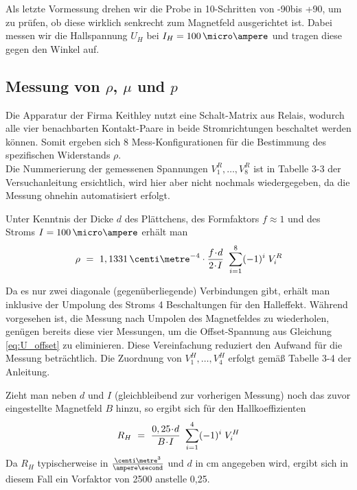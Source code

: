 Als letzte Vormessung drehen wir die Probe in 10\degree-Schritten von -90\degree bis +90\degree, um zu prüfen, ob diese wirklich senkrecht zum Magnetfeld ausgerichtet ist. Dabei messen wir die Hallspannung $U_H$ bei $I_H = 100\,\micro\ampere$ und tragen diese gegen den Winkel auf.

\newpage
\subsection{Messung von $\rho$, $\mu$ und $p$}

Die Apparatur der Firma Keithley nutzt eine Schalt-Matrix aus Relais, wodurch alle vier benachbarten Kontakt-Paare in beide Stromrichtungen beschaltet werden können. Somit ergeben sich 8 Mess-Konfigurationen für die Bestimmung des spezifischen Widerstands $\rho$.\\
Die Nummerierung der gemessenen Spannungen $V^R_1, \dots, V^R_8$ ist in Tabelle 3-3 der Versuchanleitung ersichtlich, wird hier aber nicht nochmals wiedergegeben, da die Messung ohnehin automatisiert erfolgt.

Unter Kenntnis der Dicke $d$ des Plättchens, des Formfaktors $f \approx 1$ und des Stroms  $I = 100\,\micro\ampere$ erhält man
\begin{equation}
\rho ~=~ 1,1331 \,\centi\metre^{-4} \cdot \frac{f \cdt d}{2 \cdt I} ~ \sum\limits_{i=1}^8 (-1)^i \; V^R_i
\end{equation}

Da es nur zwei \glqq diagonale\grqq{} (gegenüberliegende) Verbindungen gibt, erhält man inklusive der Umpolung des Stroms 4 Beschaltungen für den Halleffekt. Während vorgesehen ist, die Messung nach Umpolen des Magnetfeldes zu wiederholen, genügen bereits diese vier Messungen, um die Offset-Spannung aus Gleichung \eqref{eq:U_offset} zu eliminieren. Diese Vereinfachung reduziert den Aufwand für die Messung beträchtlich. Die Zuordnung von $V^H_1, \dots, V^H_4$ erfolgt gemäß Tabelle 3-4 der Anleitung.

Zieht man neben $d$ und $I$ (gleichbleibend zur vorherigen Messung) noch das zuvor eingestellte Magnetfeld $B$ hinzu, so ergibt sich für den Hallkoeffizienten 
\begin{equation}
R_H ~=~ \frac{0,25 \!\cdot\! d}{B \!\cdot\! I} ~ \sum\limits_{i=1}^4 (-1)^i \; V^H_i
\end{equation}
Da $R_H$ typischerweise in $\tfrac{\centi\metre^3}{\ampere\second}$ und $d$ in cm angegeben wird, ergibt sich in diesem Fall ein Vorfaktor von 2500 anstelle 0,25.


